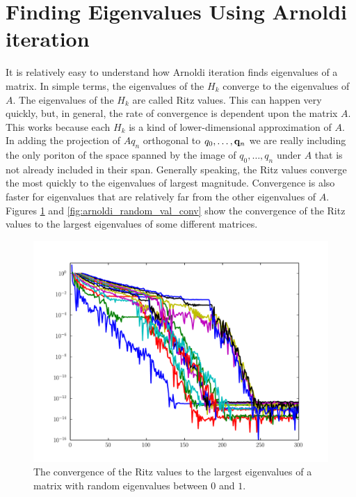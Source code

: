 
\section*{Finding Eigenvalues Using Arnoldi iteration}

It is relatively easy to understand how Arnoldi iteration finds eigenvalues of a matrix.
In simple terms, the eigenvalues of the $H_k$ converge to the eigenvalues of $A$.
The eigenvalues of the $H_k$ are called Ritz values.
This can happen very quickly, but, in general, the rate of convergence is dependent upon the matrix $A$.
This works because each $H_k$ is a kind of lower-dimensional approximation of $A$.
In adding the projection of $A q_n$ orthogonal to $q_0, \dots, {\bf q}_n$ we are really including the only poriton of the space spanned by the image of $q_0, \dots, q_n$ under $A$ that is not already included in their span.
Generally speaking, the Ritz values converge the most quickly to the eigenvalues of largest magnitude.
Convergence is also faster for eigenvalues that are relatively far from the other eigenvalues of $A$.
Figures \ref{fig:arnoldi_random_eig_conv} and \ref{fig:arnoldi_random_val_conv} show the convergence of the Ritz values to the largest eigenvalues of some different matrices.

\begin{figure}
\includegraphics[width=\textwidth]{rand_eigs_conv.pdf}
\caption{The convergence of the Ritz values to the largest eigenvalues of a matrix with random eigenvalues between $0$ and $1$.}
\label{fig:arnoldi_random_eig_conv}
\end{figure}

